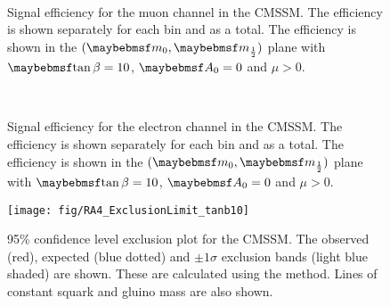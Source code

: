 \begin{figure}
\centering
{}
\\
\caption[Signal efficiency for the muon channel in the \acs{CMSSM}]{Signal
  efficiency for the muon channel in the \ac{CMSSM}. The efficiency is shown
  separately for each \STlep bin and as a total. The efficiency is shown in the
  $(\Mzero, \Mhalf)$ plane with $\tanbeta=10$, $\Azero=0$ and $\mu > 0$.}
\label{fig:inter_msugra_mu}
\end{figure}

\begin{figure}
\centering
{}
\\
\caption[Signal efficiency for the electron channel in the \acs{CMSSM}]{Signal
  efficiency for the electron channel in the \ac{CMSSM}. The efficiency is shown
  separately for each \STlep bin and as a total. The efficiency is shown in the
  $(\Mzero, \Mhalf)$ plane with $\tanbeta=10$, $\Azero=0$ and $\mu > 0$.}
\label{fig:inter_msugra_el}
\end{figure}

\begin{figure}
\texttt{[image: fig/RA4\_ExclusionLimit\_tanb10]}
\caption[95\% confidence level exclusion plot for the \acs{CMSSM}]{95\%
  confidence level exclusion plot for the \ac{CMSSM}. The observed (red),
  expected (blue dotted) and $\pm 1\sigma$ exclusion bands (light blue shaded)
  are shown. These are calculated using the \CLs method. Lines of constant
  squark and gluino mass are also shown.}
\label{fig:inter_msugra_exclusion}
\end{figure}

